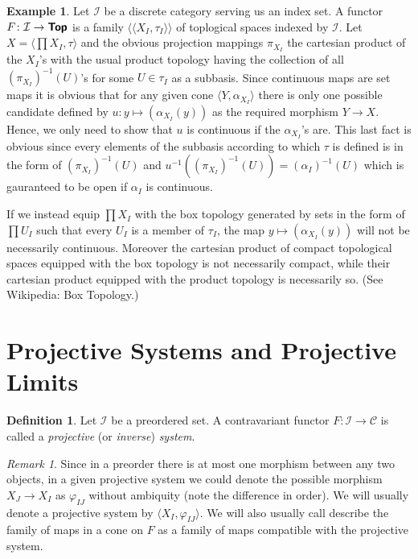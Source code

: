 \documentclass[12pt]{article}
\theoremstyle{definition}
\newtheorem{dfn}[thm]{Definition}
\newtheorem{exm}[thm]{Example}
\theoremstyle{remark}
\newtheorem{rem}[thm]{Remark}
\newcommand{\catvar}[1]{\mathcal{#1}}
\newcommand{\CC}{\catvar{C}}
\newcommand{\II}{\catvar{I}}
\newcommand{\catname}[1]{\textup{\sffamily\textbf{#1}}}
\newcommand*{\Top}{\catname{Top}}
\begin{document}
    \begin{exm}
        Let $\II$ be a discrete category serving us an index set. A functor $F\colon\II\to\Top$ is a family $\big\langle\langle X_I,\tau_I\rangle\big\rangle$ of toplogical spaces indexed by $\II$. Let $X=\langle\prod X_I,\tau\rangle$ and the obvious projection mappings $\pi_{X_I}$ the cartesian product of the $X_I$'s with the usual product topology having the collection of all $(\pi_{X_I})^{-1}(U)$'s for some $U\in\tau_I$ as a subbasis. Since continuous maps are set maps it is obvious that for any given cone $\langle Y,\alpha_{X_I}\rangle$ there is only one possible candidate defined by $u\colon y\mapsto (\alpha_{X_I}(y))$ as the required morphism $Y\to X$. Hence, we only need to show that $u$ is continuous if the $\alpha_{X_I}$'s are. This last fact is obvious since every elements of the subbasis according to which $\tau$ is defined is in the form of $(\pi_{X_I})^{-1}(U)$ and $u^{-1}((\pi_{X_I})^{-1}(U))=(\alpha_I)^{-1}(U)$ which is gauranteed to be open if $\alpha_I$ is continuous.

        If we instead equip $\prod X_I$ with the box topology generated by sets in the form of $\prod U_I$ such that every $U_I$ is a member of $\tau_I$, the map $y\mapsto (\alpha_{X_I}(y))$ will not be necessarily continuous. Moreover the cartesian product of compact topological spaces equipped with the box topology is not necessarily compact, while their cartesian product equipped with the product topology is necessarily so. (See Wikipedia: Box Topology.)
    \end{exm}

    \section{Projective Systems and Projective Limits}

    \begin{dfn}
        Let $\II$ be a preordered set. A contravariant functor $F\colon\II\to\CC$ is called a \emph{projective} (or \emph{inverse}) \emph{system}.
    \end{dfn}

    \begin{rem}
         Since in a preorder there is at most one morphism between any two objects, in a given projective system we could denote the possible morphism $X_J\to X_I$ as $\varphi_{IJ}$ without ambiquity (note the difference in order). We will usually denote a projective system by $\langle X_I,\varphi_{IJ}\rangle$. We will also usually call describe the family of maps in a cone on $F$ as a family of maps compatible with the projective system.
    \end{rem}
\end{document}

